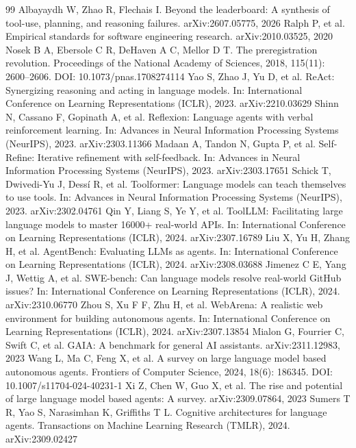 \documentclass[review]{fcs}
\begin{document}
\begin{thebibliography}{99}
 Albayaydh W, Zhao R, Flechais I. Beyond the leaderboard: A synthesis of tool-use, planning, and reasoning failures. arXiv:2607.05775, 2026
 Ralph P, et al. Empirical standards for software engineering research. arXiv:2010.03525, 2020
 Nosek B A, Ebersole C R, DeHaven A C, Mellor D T. The preregistration revolution. Proceedings of the National Academy of Sciences, 2018, 115(11): 2600--2606. DOI: 10.1073/pnas.1708274114
 Yao S, Zhao J, Yu D, et al. ReAct: Synergizing reasoning and acting in language models. In: International Conference on Learning Representations (ICLR), 2023. arXiv:2210.03629
 Shinn N, Cassano F, Gopinath A, et al. Reflexion: Language agents with verbal reinforcement learning. In: Advances in Neural Information Processing Systems (NeurIPS), 2023. arXiv:2303.11366
 Madaan A, Tandon N, Gupta P, et al. Self-Refine: Iterative refinement with self-feedback. In: Advances in Neural Information Processing Systems (NeurIPS), 2023. arXiv:2303.17651
 Schick T, Dwivedi-Yu J, Dess\'i R, et al. Toolformer: Language models can teach themselves to use tools. In: Advances in Neural Information Processing Systems (NeurIPS), 2023. arXiv:2302.04761
 Qin Y, Liang S, Ye Y, et al. ToolLLM: Facilitating large language models to master 16000+ real-world APIs. In: International Conference on Learning Representations (ICLR), 2024. arXiv:2307.16789
 Liu X, Yu H, Zhang H, et al. AgentBench: Evaluating LLMs as agents. In: International Conference on Learning Representations (ICLR), 2024. arXiv:2308.03688
 Jimenez C E, Yang J, Wettig A, et al. SWE-bench: Can language models resolve real-world GitHub issues? In: International Conference on Learning Representations (ICLR), 2024. arXiv:2310.06770
 Zhou S, Xu F F, Zhu H, et al. WebArena: A realistic web environment for building autonomous agents. In: International Conference on Learning Representations (ICLR), 2024. arXiv:2307.13854
 Mialon G, Fourrier C, Swift C, et al. GAIA: A benchmark for general AI assistants. arXiv:2311.12983, 2023
 Wang L, Ma C, Feng X, et al. A survey on large language model based autonomous agents. Frontiers of Computer Science, 2024, 18(6): 186345. DOI: 10.1007/s11704-024-40231-1
 Xi Z, Chen W, Guo X, et al. The rise and potential of large language model based agents: A survey. arXiv:2309.07864, 2023
 Sumers T R, Yao S, Narasimhan K, Griffiths T L. Cognitive architectures for language agents. Transactions on Machine Learning Research (TMLR), 2024. arXiv:2309.02427

\end{thebibliography}
\end{document}
